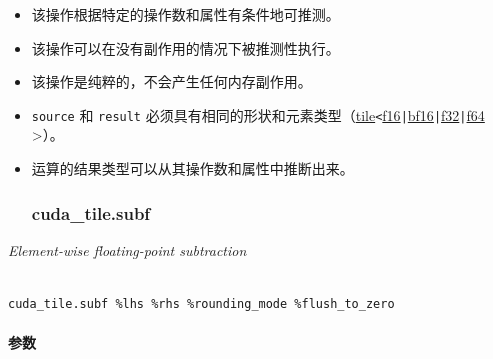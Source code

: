 \documentclass{article}
\begin{document}
\begin{itemize}
\item 该操作根据特定的操作数和属性有条件地可推测。
\item 该操作可以在没有副作用的情况下被推测性执行。
\item 该操作是纯粹的，不会产生任何内存副作用。
\item \texttt{source} 和 \texttt{result} 必须具有相同的形状和元素类型（\href{https://docs.nvidia.com/cuda/tile-ir/latest/sections/types.html#type-tile}{tile}\texttt{<}\href{https://docs.nvidia.com/cuda/tile-ir/latest/sections/types.html#subsection-element-types}{f16}\texttt{|}\href{https://docs.nvidia.com/cuda/tile-ir/latest/sections/types.html#subsection-element-types}{bf16}\texttt{|}\href{https://docs.nvidia.com/cuda/tile-ir/latest/sections/types.html#subsection-element-types}{f32}\texttt{|}\href{https://docs.nvidia.com/cuda/tile-ir/latest/sections/types.html#subsection-element-types}{f64} >）。
\item 运算的结果类型可以从其操作数和属性中推断出来。




\subsubsection{cuda\_tile.subf}


\end{itemize}
\textit{Element-wise floating-point subtraction}




\begin{lstlisting}

cuda_tile.subf %lhs %rhs %rounding_mode %flush_to_zero

\end{lstlisting}



\paragraph{参数}
\end{document}
